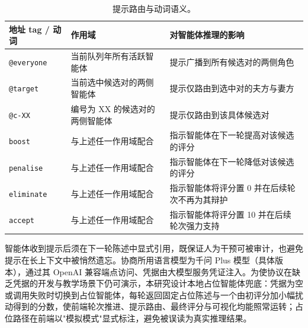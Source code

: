 \begin{table}[h]
\centering
\caption{提示路由与动词语义。}\label{tab:hint-routing}
\footnotesize
\begin{tabular}{@{}lll@{}}
\toprule
地址 tag / 动词 & 作用域 & 对智能体推理的影响 \\
\midrule
\texttt{@everyone} & 当前队列年所有活跃智能体 & 提示广播到所有候选对的两侧角色 \\
\texttt{@target} & 当前选中候选对的两侧智能体 & 提示仅路由到选中对的夫方与妻方 \\
\texttt{@c-XX} & 编号为 XX 的候选对的两侧智能体 & 提示仅路由到该具体候选对 \\
\midrule
\texttt{boost} & 与上述任一作用域配合 & 指示智能体在下一轮提高对该候选的评分 \\
\texttt{penalise} & 与上述任一作用域配合 & 指示智能体在下一轮降低对该候选的评分 \\
\texttt{eliminate} & 与上述任一作用域配合 & 指示智能体将评分置 0 并在后续轮次不再为其辩护 \\
\texttt{accept} & 与上述任一作用域配合 & 指示智能体将评分置 10 并在后续轮次强力支持 \\
\bottomrule
\end{tabular}
\end{table}

智能体收到提示后须在下一轮陈述中显式引用，既保证人为干预可被审计，也避免提示在长上下文中被悄然遗忘。协商所用语言模型为千问 Plus 模型（具体版本），通过其 OpenAI 兼容端点访问、凭据由大模型服务凭证注入。为使协议在缺乏凭据的开发与教学场景下仍可演示，本研究设计本地占位智能体兜底：凭据为空或调用失败时切换到占位智能体，每轮返回固定占位陈述与一个由初评分加小幅扰动得到的分数，使前端轮次推进、提示路由、最终评分与可视化均能照常运转；占位路径在前端以"模拟模式"显式标注，避免被误读为真实推理结果。
